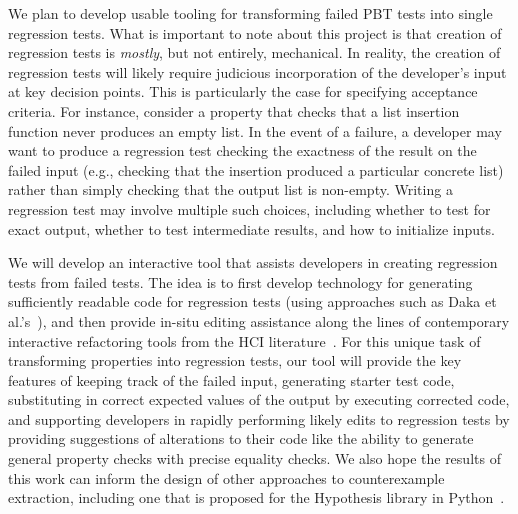 We plan to develop usable tooling for transforming failed PBT tests into single
regression tests. What is important to note about this project is that creation
of regression tests is \emph{mostly}, but not entirely, mechanical. In reality,
the creation of regression tests will likely require judicious incorporation of
the developer's input at key decision points. This is particularly the case for
specifying acceptance criteria. For instance, consider a property that checks
that a list insertion function never produces an empty list. In the event of a
failure, a developer may want to produce a regression test checking the
exactness of the result on the failed input (e.g., checking that the insertion
produced a particular concrete list) rather than simply checking that the output
list is non-empty.  Writing a regression test may involve multiple such
choices, including whether to test for exact output, whether to test
intermediate results, and how to initialize inputs.

We will develop an interactive tool that assists developers in creating
regression tests from failed tests. The idea is to first develop
technology for generating sufficiently readable code for regression tests (using
approaches such as Daka et al.'s~\cite{ref:daka2015modeling}), and then provide
in-situ editing assistance along the lines of contemporary interactive
refactoring tools from the HCI
literature~\cite{ref:head2018interactive,ref:barik2016quick,ref:murphyhill2008refactoring,ref:lee2013draganddrop}.
For this unique task of transforming properties into regression tests,
our tool will provide the key features of keeping track of the failed input,
generating starter test code, substituting in correct expected values of the
output by executing corrected code, and supporting developers in rapidly
performing likely edits to regression tests by providing suggestions of
alterations to their code like the ability to generate general property checks
with precise equality checks. We also hope the results of this work
can inform the
design of other approaches to counterexample extraction, including one that is
proposed for the Hypothesis library in Python~\cite{maciver2019hypothesis}.


